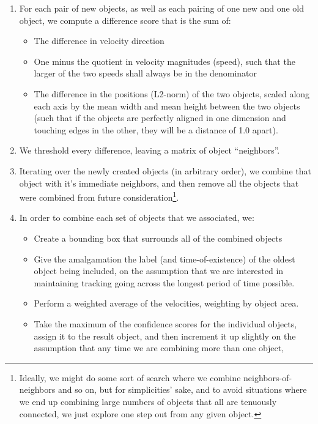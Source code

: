 \documentclass{article}
\begin{document}
\begin{enumerate}
\item For each pair of new objects, as well as each pairing of one new and one
      old object, we compute a difference score that is the sum of:
  \begin{itemize}
  \item The difference in velocity direction
  \item One minus the quotient in velocity magnitudes (speed), such that the
        larger of the two speeds shall always be in the denominator
  \item The difference in the positions (L2-norm) of the two objects, scaled
        along each axis by the mean width and mean height between the two
        objects (such that if the objects are perfectly aligned in one dimension
        and touching edges in the other, they will be a distance of 1.0 apart).
  \end{itemize}
\item We threshold every difference, leaving a matrix of object ``neighbors''.
\item Iterating over the newly created objects (in arbitrary order), we
      combine that object with it's immediate neighbors, and then remove
      all the objects that were combined from future
      consideration\footnote{Ideally, we might do some sort of search where we
      combine neighbors-of-neighbors and so on, but for simplicities' sake, and
      to avoid situations where we end up combining large numbers of objects
      that all are tenuously connected, we just explore one step out from any
      given object.}.
\item In order to combine each set of objects that we associated, we:
  \begin{itemize}
    \item Create a bounding box that surrounds all of the combined objects
    \item Give the amalgamation the label (and time-of-existence) of the oldest
          object being included, on the assumption that we are interested
          in maintaining tracking going across the longest period of time possible.
    \item Perform a weighted average of the velocities, weighting by object area.
    \item Take the maximum of the confidence scores for the individual objects,
          assign it to the result object, and then increment it up slightly on
          the assumption that any time we are combining more than one object,

\end{itemize}
\end{enumerate}
\end{document}
